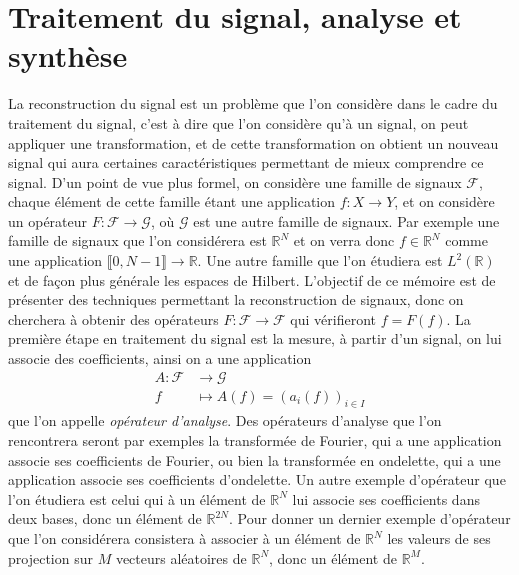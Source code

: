 \section{Traitement du signal, analyse et synthèse}
La reconstruction du signal est un problème que l'on considère dans le cadre du traitement du signal, c'est à dire que l'on considère qu'à un signal, on peut appliquer une transformation, et de cette transformation on obtient un nouveau signal qui aura certaines caractéristiques permettant de mieux comprendre ce signal.
D'un point de vue plus formel, on considère une famille de signaux $\mathcal{F}$, chaque élément de cette famille étant une application $f : X \longrightarrow Y$, et on considère un opérateur $F : \mathcal{F} \longrightarrow \mathcal{G}$, où $\mathcal{G}$ est une autre famille de signaux.
\newline
Par exemple une famille de signaux que l'on considérera est $\mathbb{R}^N$ et on verra donc $f\in \mathbb{R}^N$ comme une application $\llbracket 0,N-1 \rrbracket \rightarrow \mathbb{R}$.
Une autre famille que l'on étudiera est $L^2(\mathbb{R})$ et de façon plus générale les espaces de Hilbert. 
\newline
L'objectif de ce mémoire est de présenter des techniques permettant la reconstruction de signaux, donc on cherchera à obtenir des opérateurs $F	:\mathcal{F} \rightarrow \mathcal{F}$ qui vérifieront $f=F(f)$. 
La première étape en traitement du signal est la mesure, à partir d'un signal, on lui associe des coefficients, ainsi on a une application
\begin{align}
	A : 	\mathcal{F} &\longrightarrow \mathcal{G} \\
		f &\longmapsto A(f) = (a_i(f))_{i\in I}
\end{align}
que l'on appelle \emph{opérateur d'analyse}.
\newline
Des opérateurs d'analyse que l'on rencontrera seront par exemples la transformée de Fourier, qui a une application associe ses coefficients de Fourier, ou bien la transformée en ondelette, qui a une application associe ses coefficients d'ondelette.
Un autre exemple d'opérateur que l'on étudiera est celui qui à un élément de $\mathbb{R}^N$ lui associe ses coefficients dans deux bases, donc un élément de $\mathbb{R}^{2N}$.
Pour donner un dernier exemple d'opérateur que l'on considérera consistera à associer à un élément de $\mathbb{R}^N$ les valeurs de ses projection sur $M$ vecteurs aléatoires de $\mathbb{R}^N$, donc un élément de $\mathbb{R}^M$.

